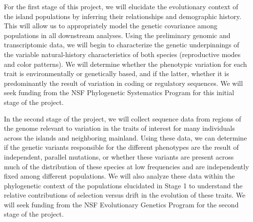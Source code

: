 For the first stage of this project, we will elucidate the evolutionary context
of the island populations by inferring their relationships and demographic
history.
This will allow us to appropriately model the genetic covariance among
populations in all downstream analyses.
Using the preliminary genomic and transcriptomic data, we will begin to
characterize the genetic underpinnings of the variable natural-history
characteristics of both species (reproductive modes and color patterns).
We will determine whether the phenotypic variation for each trait is
environmentally or genetically based, and if the latter, whether it is
predominantly the result of variation in coding or regulatory sequences.
We will seek funding from the NSF Phylogenetic Systematics Program for this
initial stage of the project.


In the second stage of the project, we will collect sequence data from regions
of the genome relevant to variation in the traits of interest for many
individuals across the islands and neighboring mainland.
Using these data, we can determine if the genetic variants responsible for the
different phenotypes are the result of independent, parallel mutations, or
whether these variants are present across much of the distribution of these
species at low frequencies and are independently fixed among different
populations.
We will also analyze these data within the phylogenetic context of the
populations elucidated in Stage 1 to understand the relative contributions of
selection versus drift in the evolution of these traits.
We will seek funding from the NSF Evolutionary Genetics Program for the second
stage of the project.

